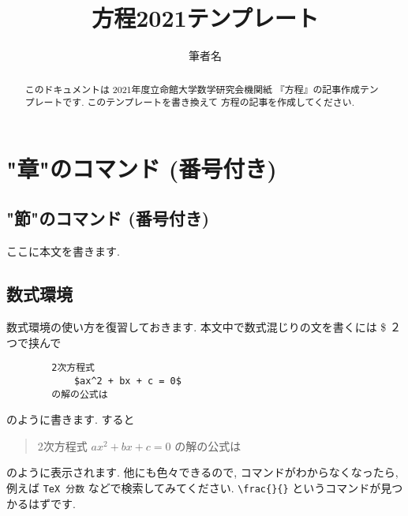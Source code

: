 
\title{方程2021テンプレート}
\author{筆者名}
\date{}

\maketitle

\begin{abstract}
    このドキュメントは
    2021年度立命館大学数学研究会機関紙
    『方程』の記事作成テンプレートです. 
    このテンプレートを書き換えて
    方程の記事を作成してください. 
\end{abstract}


\section{"章"のコマンド (番号付き) }

\subsection{"節"のコマンド (番号付き) }

ここに本文を書きます. 


\subsection{数式環境}

数式環境の使い方を復習しておきます. 
本文中で数式混じりの文を書くには \$ ２つで挟んで
\begin{screen}
    \begin{verbatim}
        2次方程式
            $ax^2 + bx + c = 0$
        の解の公式は\end{verbatim}
\end{screen}
のように書きます. すると
\begin{screen}
    \begin{quote}
        2次方程式
            $ ax^2 + bx + c = 0 $
        の解の公式は
    \end{quote}
\end{screen}
のように表示されます. 他にも色々できるので, 
コマンドがわからなくなったら, 例えば
\verb|TeX 分数|
などで検索してみてください. 
\verb|\frac{}{}|
というコマンドが見つかるはずです. 

